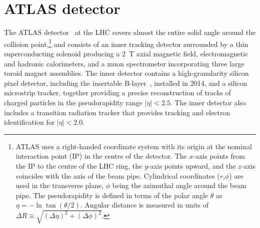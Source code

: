 \section{ATLAS detector}
\label{sec:detector}

The ATLAS detector~\cite{PERF-2007-01} at the LHC covers almost the entire solid angle around the collision point,\footnote{ATLAS 
uses a right-handed coordinate system with its origin at the nominal interaction point (IP) in the 
centre of the detector.  
The $x$-axis points from
the IP to the centre of the LHC ring, %
the $y$-axis points upward,
and the $z$-axis coincides with the axis of the beam pipe.
Cylindrical coordinates ($r$,$\phi$) are used 
in the transverse plane, $\phi$ being the azimuthal angle around the beam pipe. The pseudorapidity is defined in 
terms of the polar angle $\theta$ as $\eta = - \ln \tan(\theta/2)$.
Angular distance is measured in units of $\Delta R\equiv \sqrt{(\Delta\eta)^2+(\Delta\phi)^2}$.} and
consists of an inner tracking detector surrounded by a thin superconducting solenoid producing a
2~T axial magnetic field, electromagnetic and hadronic calorimeters, and a muon spectrometer
incorporating three large toroid magnet assemblies. The inner detector contains a high-granularity silicon pixel detector, 
including the %
insertable B-layer~\cite{IBL}, installed in 2014,
and a silicon microstrip tracker,
together providing a precise reconstruction of tracks of charged particles in the pseudorapidity range $|\eta|<2.5$.
The inner detector also includes a transition radiation tracker that provides tracking and electron identification for $|\eta|<2.0$.
